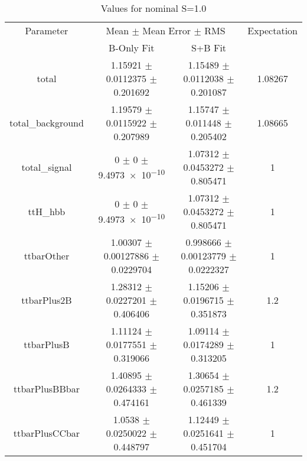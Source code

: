 \begin{table}
\centering
\caption{Values for nominal S=1.0}
\begin{tabular}{cccc}
\toprule
Parameter & \multicolumn{2}{c}{Mean $\pm$ Mean Error $\pm$ RMS} & Expectation\\
 & B-Only Fit & S+B Fit & \\
\midrule
total & \num{1.15921} $\pm$ \num{0.0112375} $\pm$ \num{0.201692} & \num{1.15489} $\pm$ \num{0.0112038} $\pm$ \num{0.201087} & \num{1.08267}\\
total\_background & \num{1.19579} $\pm$ \num{0.0115922} $\pm$ \num{0.207989} & \num{1.15747} $\pm$ \num{0.011448} $\pm$ \num{0.205402} & \num{1.08665}\\
total\_signal & \num{0} $\pm$ \num{0} $\pm$ \num{9.4973e-10} & \num{1.07312} $\pm$ \num{0.0453272} $\pm$ \num{0.805471} & \num{1}\\
ttH\_hbb & \num{0} $\pm$ \num{0} $\pm$ \num{9.4973e-10} & \num{1.07312} $\pm$ \num{0.0453272} $\pm$ \num{0.805471} & \num{1}\\
ttbarOther & \num{1.00307} $\pm$ \num{0.00127886} $\pm$ \num{0.0229704} & \num{0.998666} $\pm$ \num{0.00123779} $\pm$ \num{0.0222327} & \num{1}\\
ttbarPlus2B & \num{1.28312} $\pm$ \num{0.0227201} $\pm$ \num{0.406406} & \num{1.15206} $\pm$ \num{0.0196715} $\pm$ \num{0.351873} & \num{1.2}\\
ttbarPlusB & \num{1.11124} $\pm$ \num{0.0177551} $\pm$ \num{0.319066} & \num{1.09114} $\pm$ \num{0.0174289} $\pm$ \num{0.313205} & \num{1}\\
ttbarPlusBBbar & \num{1.40895} $\pm$ \num{0.0264333} $\pm$ \num{0.474161} & \num{1.30654} $\pm$ \num{0.0257185} $\pm$ \num{0.461339} & \num{1.2}\\
ttbarPlusCCbar & \num{1.0538} $\pm$ \num{0.0250022} $\pm$ \num{0.448797} & \num{1.12449} $\pm$ \num{0.0251641} $\pm$ \num{0.451704} & \num{1}\\
\bottomrule
\end{tabular}
\end{table}